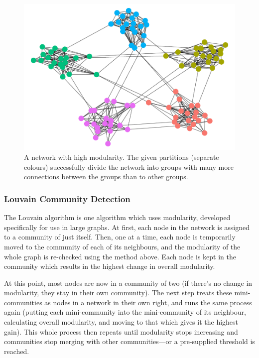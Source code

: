 \documentclass[
]{book}
\begin{document}
\begin{figure}
\centering
\includegraphics{_main_files/figure-latex/unnamed-chunk-35-1.pdf}
\caption{\label{fig:unnamed-chunk-35}A network with high modularity. The given partitions (separate colours) successfully divide the network into groups with many more connections between the groups than to other groups.}
\end{figure}

\hypertarget{louvain-community-detection}{%
\subsubsection{Louvain Community Detection}\label{louvain-community-detection}}

The Louvain algorithm is one algorithm which uses modularity, developed specifically for use in large graphs. At first, each node in the network is assigned to a community of just itself. Then, one at a time, each node is temporarily moved to the community of each of its neighbours, and the modularity of the whole graph is re-checked using the method above. Each node is kept in the community which results in the highest change in overall modularity.~

At this point, most nodes are now in a community of two (if there's no change in modularity, they stay in their own community). The next step treats these mini-communities as nodes in a network in their own right, and runs the same process again (putting each mini-community into the mini-community of its neighbour, calculating overall modularity, and moving to that which gives it the highest gain). This whole process then repeats until modularity stops increasing and communities stop merging with other communities---or a pre-supplied threshold is reached.
\end{document}

